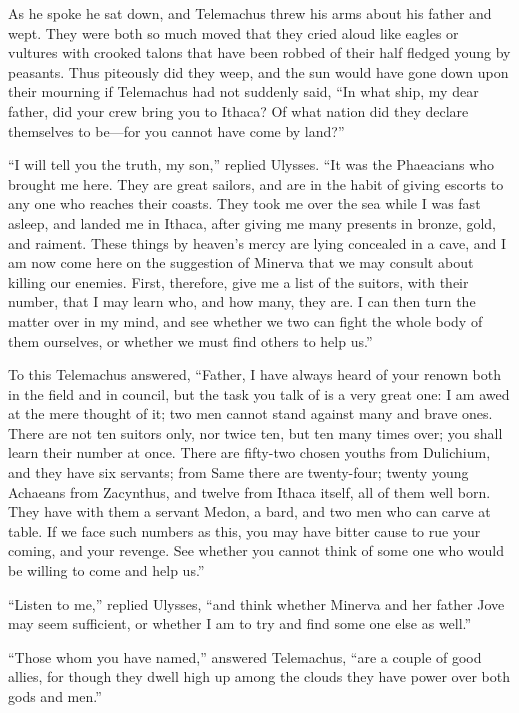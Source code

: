 As he spoke he sat down, and Telemachus threw his arms about his father and
wept. They were both so much moved that they cried aloud like eagles or
vultures with crooked talons that have been robbed of their half fledged young
by peasants. Thus piteously did they weep, and the sun would have gone down
upon their mourning if Telemachus had not suddenly said, “In what ship, my dear
father, did your crew bring you to Ithaca? Of what nation did they declare
themselves to be—for you cannot have come by land?”

“I will tell you the truth, my son,” replied Ulysses. “It was the Phaeacians
who brought me here. They are great sailors, and are in the habit of giving
escorts to any one who reaches their coasts. They took me over the sea while I
was fast asleep, and landed me in Ithaca, after giving me many presents in
bronze, gold, and raiment. These things by heaven’s mercy are lying concealed
in a cave, and I am now come here on the suggestion of Minerva that we may
consult about killing our enemies. First, therefore, give me a list of the
suitors, with their number, that I may learn who, and how many, they are. I can
then turn the matter over in my mind, and see whether we two can fight the
whole body of them ourselves, or whether we must find others to help us.”

To this Telemachus answered, “Father, I have always heard of your renown both
in the field and in council, but the task you talk of is a very great one: I am
awed at the mere thought of it; two men cannot stand against many and brave
ones. There are not ten suitors only, nor twice ten, but ten many times over;
you shall learn their number at once. There are fifty-two chosen youths from
Dulichium, and they have six servants; from Same there are twenty-four; twenty
young Achaeans from Zacynthus, and twelve from Ithaca itself, all of them well
born. They have with them a servant Medon, a bard, and two men who can carve at
table. If we face such numbers as this, you may have bitter cause to rue your
coming, and your revenge. See whether you cannot think of some one who would be
willing to come and help us.”

“Listen to me,” replied Ulysses, “and think whether Minerva and her father Jove
may seem sufficient, or whether I am to try and find some one else as well.”

“Those whom you have named,” answered Telemachus, “are a couple of good allies,
for though they dwell high up among the clouds they have power over both gods
and men.”


